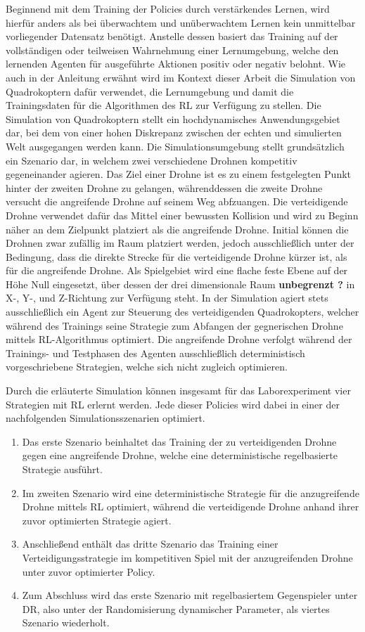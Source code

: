 Beginnend mit dem Training der Policies durch verstärkendes Lernen, wird hierfür anders als bei überwachtem und unüberwachtem Lernen kein unmittelbar vorliegender Datensatz benötigt.
Anstelle dessen basiert das Training auf der vollständigen oder teilweisen Wahrnehmung einer Lernumgebung, welche den lernenden Agenten für ausgeführte Aktionen positiv oder negativ belohnt.
Wie auch in der Anleitung erwähnt wird im Kontext dieser Arbeit die Simulation von Quadrokoptern dafür verwendet, die Lernumgebung und damit die Trainingsdaten für die Algorithmen des RL zur Verfügung zu stellen.
Die Simulation von Quadrokoptern stellt ein hochdynamisches Anwendungsgebiet dar, bei dem von einer hohen Diskrepanz zwischen der echten und simulierten Welt ausgegangen werden kann. 
Die Simulationsumgebung stellt grundsätzlich ein Szenario dar, in welchem zwei verschiedene Drohnen kompetitiv gegeneinander agieren.
Das Ziel einer Drohne ist es zu einem festgelegten Punkt hinter der zweiten Drohne zu gelangen, währenddessen die zweite Drohne versucht die angreifende Drohne auf seinem Weg abfzuangen. 
Die verteidigende Drohne verwendet dafür das Mittel einer bewussten Kollision und wird zu Beginn näher an dem Zielpunkt platziert als die angreifende Drohne. 
Initial können die Drohnen zwar zufällig im Raum platziert werden, jedoch ausschließlich unter der Bedingung, dass die direkte Strecke für die verteidigende Drohne kürzer ist, als für die angreifende Drohne.
Als Spielgebiet wird eine flache feste Ebene auf der Höhe Null eingesetzt, über dessen der drei dimensionale Raum \textbf{unbegrenzt ?} in X-, Y-, und Z-Richtung zur Verfügung steht.
In der Simulation agiert stets ausschließlich ein Agent zur Steuerung des verteidigenden Quadrokopters, welcher während des Trainings seine Strategie zum Abfangen der gegnerischen Drohne mittels RL-Algorithmus optimiert. 
Die angreifende Drohne verfolgt während der Trainings- und Testphasen des Agenten ausschließlich deterministisch vorgeschriebene Strategien, welche sich nicht zugleich optimieren.

Durch die erläuterte Simulation können insgesamt für das Laborexperiment vier Strategien mit RL erlernt werden.
Jede dieser Policies wird dabei in einer der nachfolgenden Simulationsszenarien optimiert.
\begin{enumerate}
    \item Das erste Szenario beinhaltet das Training der zu verteidigenden Drohne gegen eine angreifende Drohne, welche eine deterministische regelbasierte Strategie ausführt.
    \item Im zweiten Szenario wird eine deterministische Strategie für die anzugreifende Drohne mittels RL optimiert, während die verteidigende Drohne anhand ihrer zuvor optimierten Strategie agiert.
    \item Anschließend enthält das dritte Szenario das Training einer Verteidigungsstrategie im kompetitiven Spiel mit der anzugreifenden Drohne unter zuvor optimierter Policy.
    \item Zum Abschluss wird das erste Szenario mit regelbasiertem Gegenspieler unter DR, also unter der Randomisierung dynamischer Parameter, als viertes Szenario wiederholt. 
\end{enumerate}

